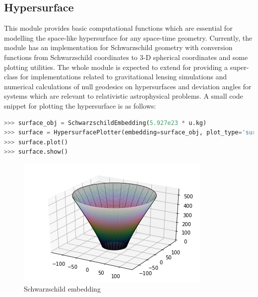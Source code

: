 \documentclass[refree]{aa}
\begin{document}
\subsection{Hypersurface}
This module provides basic computational functions which are essential for modelling the space-like hypersurface for any space-time geometry. Currently, the module has an implementation for Schwarzschild geometry with conversion functions from Schwarzschild coordinates to 3-D spherical coordinates and some plotting utilities. The whole module is expected to extend for providing a super-class for implementations related to gravitational lensing simulations and numerical calculations of null geodesics on hypersurfaces and deviation angles for systems which are relevant to relativistic astrophysical problems. A small code snippet for plotting the hypersurface is as follows:
\begin{lstlisting}[language=Python, caption=Schwarzschild Embedding]
>>> surface_obj = SchwarzschildEmbedding(5.927e23 * u.kg)
>>> surface = HypersurfacePlotter(embedding=surface_obj, plot_type='surface')
>>> surface.plot()
>>> surface.show()
\end{lstlisting}
\begin{figure}[ht]
	\centering
	\includegraphics[scale=0.5]{figures/hypersurface_surface.png} %
	\caption{Schwarzschild embedding}
	\label{fig:hypersurface}
\end{figure}
\end{document}
